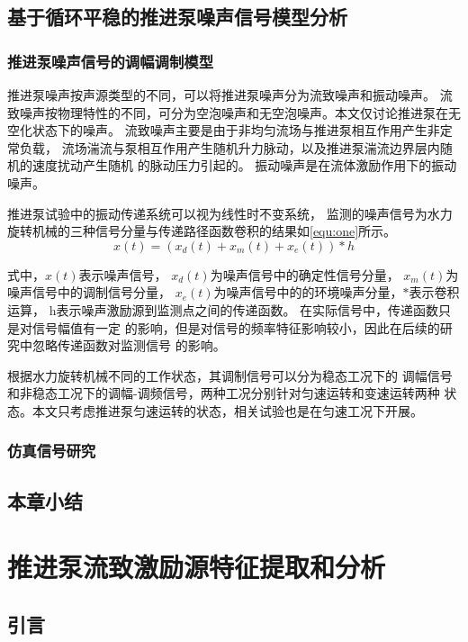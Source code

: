 \section{基于循环平稳的推进泵噪声信号模型分析}
\subsection{推进泵噪声信号的调幅调制模型}
推进泵噪声按声源类型的不同，可以将推进泵噪声分为流致噪声和振动噪声。
流致噪声按物理特性的不同，可分为空泡噪声和无空泡噪声。本文仅讨论推进泵在无空化状态下的噪声。
流致噪声主要是由于非均匀流场与推进泵相互作用产生非定常负载，
流场湍流与泵相互作用产生随机升力脉动，以及推进泵湍流边界层内随机的速度扰动产生随机
的脉动压力引起的。
振动噪声是在流体激励作用下的振动噪声。

推进泵试验中的振动传递系统可以视为线性时不变系统，
监测的噪声信号为水力旋转机械的三种信号分量与传递路径函数卷积的结果如\autoref{equ:one}所示。 
\begin{equation}
    \label{equ:component}
    x\left ( t \right ) =\left ( x_d\left ( t \right )+x_m\left ( t \right )+x_e\left ( t \right ) \right )\ast h 
\end{equation}

式中，$x\left ( t \right )$表示噪声信号，
$x_d\left ( t \right )$为噪声信号中的确定性信号分量，
$x_m\left ( t \right )$为噪声信号中的调制信号分量，
$x_e\left ( t \right )$为噪声信号中的的环境噪声分量，$\ast$表示卷积运算，
h表示噪声激励源到监测点之间的传递函数。 
在实际信号中，传递函数只是对信号幅值有一定
的影响，但是对信号的频率特征影响较小，因此在后续的研究中忽略传递函数对监测信号
的影响。 


根据水力旋转机械不同的工作状态，其调制信号可以分为稳态工况下的
调幅信号和非稳态工况下的调幅-调频信号，两种工况分别针对匀速运转和变速运转两种
状态。本文只考虑推进泵匀速运转的状态，相关试验也是在匀速工况下开展。 


\subsection{仿真信号研究}
\section{本章小结}


\chapter{推进泵流致激励源特征提取和分析}
\section{引言}
